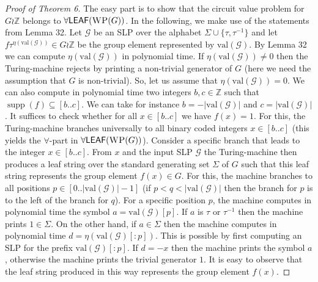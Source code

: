 \documentclass[10pt,a4paper]{article}
\newcommand{\ccinterval}[2]{[{#1}..{#2}]}
\newcommand{\WP}{\textsc{WP}\xspace}
\newcommand{\supp}{\operatorname{supp}}
\newcommand{\cointerval}[2]{[{#1}..{#2}-1]}
\newcommand{\LEAF}{\mathsf{LEAF}}
\newcommand{\val}{\mathrm{val}}
\begin{document}
\begin{proof}[Proof of Theorem 6]
The easy part is to show that the circuit value problem for $G \wr \mathbb{Z}$ belongs to
$\forall\LEAF(\WP(G))$. In the following, we make use
of the statements from Lemma 32.
Let $\mathcal{G}$ be an SLP over the alphabet $\Sigma \cup \{\tau,\tau^{-1}\}$ and let $f \tau^{\eta(\val(\mathcal{G}))} \in G \wr \mathbb{Z}$
be the group element represented by $\val(\mathcal{G})$. By Lemma 32 we can compute $\eta(\val(\mathcal{G}))$ in polynomial time. 
If $\eta(\val(\mathcal{G})) \neq 0$ then the Turing-machine rejects by printing a non-trivial generator of $G$ (here we need the assumption that
$G$ is non-trivial).
So, let us assume that $\eta(\val(\mathcal{G}))=0$. 
We can also compute in polynomial time two integers $b,c \in \mathbb{Z}$ such that $\supp(f) \subseteq \ccinterval{b}{c}$. We can
take for instance $b = -|\val(\mathcal{G})|$ and $c = |\val(\mathcal{G})|$. It suffices to check whether for all
$ x \in \ccinterval{b}{c}$ we have $ f(x)=1$. For this, the Turing-machine branches universally to all binary coded integers $x \in \ccinterval{b}{c}$
(this yields the $\forall$-part in $\forall \LEAF(\WP(G))$). Consider a specific branch that leads to the integer 
$x \in \ccinterval{b}{c}$. From $x$ and the input SLP $\mathcal{G}$ the Turing-machine then produces a leaf string over the standard
generating set $\Sigma$ of $G$ such that this leaf string represents the group element $f(x) \in G$. For this, the machine
branches to all positions $p \in \cointerval{0}{|\val(\mathcal{G})|}$ (if $p<q<|\val(\mathcal{G})|$ then the branch for $p$ is to the left 
of the branch for $q$). For a specific position $p$, the machine computes in polynomial time the symbol
$a = \val(\mathcal{G})[p]$. If $a$ is $\tau$ or $\tau^{-1}$ then the machine prints $1 \in \Sigma$. On the other hand, if 
$a \in \Sigma$ then the machine computes in polynomial time $d = \eta(\val(\mathcal{G})[:p])$. This is possible by first
computing an SLP for the prefix $\val(\mathcal{G})[:p]$. If $d=-x$ then the machine prints the symbol $a$, otherwise
the machine prints the trivial generator $1$. It is easy to observe that the leaf string produced in this way represents the 
group element $f(x)$.


\end{proof}
\end{document}
